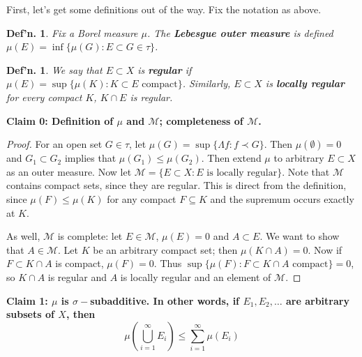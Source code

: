 \documentclass[12pt, a4paper]{book}
\newtheorem{definition}[theorem]{Def'n.}
\theoremstyle{nonumberplain}
\newtheorem{proof}{Proof}
\begin{document}
First, let's get some definitions out of the way.
Fix the notation as above.
\begin{definition}
    Fix a Borel measure $\mu$.
    The \textbf{Lebesgue outer measure} is defined $\mu(E)=\inf\{\mu(G):E\subset G\in\tau\}$.
\end{definition}
\begin{definition}
    We say that $E\subset X$ is \textbf{regular} if $\mu(E)=\sup\{\mu(K):K\subset E\text{ compact}\}$.
    Similarly, $E\subset X$ is \textbf{locally regular} for every compact $K$, $K\cap E$ is regular.
\end{definition}
\textbf{Claim 0: Definition of $\mu$ and $\mathcal{M}$; completeness of $\mathcal{M}$.}
\begin{proof}
    For an open set $G\in\tau$, let $\mu(G)=\sup\{\Lambda f:f\prec G\}$.
    Then $\mu(\emptyset)=0$ and $G_1\subset G_2$ implies that $\mu(G_1)\leq\mu(G_2)$.
    Then extend $\mu$ to arbitrary $E\subset X$ as an outer measure.
    Now let $\mathcal{M}=\{E\subset X:E\text{ is locally regular}\}$.
    Note that $\mathcal{M}$ contains compact sets, since they are regular.
    This is direct from the definition, since $\mu(F)\leq\mu(K)$ for any compact $F\subseteq K$ and the supremum occurs exactly at $K$.

    As well, $\mathcal{M}$ is complete: let $E\in\mathcal{M}$, $\mu(E)=0$ and $A\subset E$.
    We want to show that $A\in\mathcal{M}$.
    Let $K$ be an arbitrary compact set; then $\mu(K\cap A)=0$.
    Now if $F\subset K\cap A$ is compact, $\mu(F)=0$.
    Thus $\sup\{\mu(F):F\subset K\cap A\text{ compact}\}=0$, so $K\cap A$ is regular and $A$ is locally regular and an element of $\mathcal{M}$.
\end{proof}
\textbf{Claim 1: $\mu$ is $\sigma-$subadditive.
In other words, if $E_1,E_2,\ldots$ are arbitrary subsets of $X$, then
\begin{equation*}\mu\left(\bigcup\limits_{i=1}^\infty E_i\right)\leq\sum\limits_{i=1}^\infty \mu(E_i)\end{equation*}
}
\end{document}
